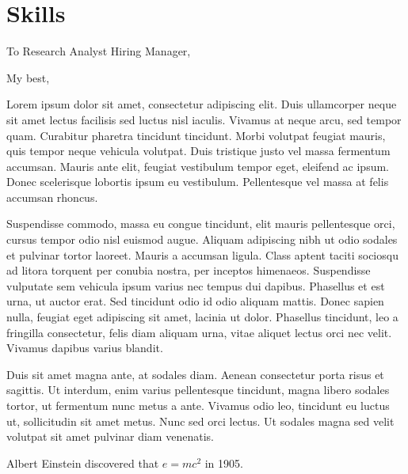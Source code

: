 \documentclass[11pt, sans]{moderncv}
\begin{document}
\section*{Skills}
\label{sec:org39c2da3}

\clearpage
{}
\date{\today}
\opening{To Research Analyst Hiring Manager,}
\closing{My best,}
\makelettertitle

Lorem ipsum dolor sit amet, consectetur adipiscing elit. Duis
ullamcorper neque sit amet lectus facilisis sed luctus nisl
iaculis. Vivamus at neque arcu, sed tempor quam. Curabitur pharetra
tincidunt tincidunt. Morbi volutpat feugiat mauris, quis tempor neque
vehicula volutpat. Duis tristique justo vel massa fermentum
accumsan. Mauris ante elit, feugiat vestibulum tempor eget, eleifend
ac ipsum. Donec scelerisque lobortis ipsum eu vestibulum. Pellentesque
vel massa at felis accumsan rhoncus.


Suspendisse commodo, massa eu congue tincidunt, elit mauris
pellentesque orci, cursus tempor odio nisl euismod augue. Aliquam
adipiscing nibh ut odio sodales et pulvinar tortor laoreet. Mauris a
accumsan ligula. Class aptent taciti sociosqu ad litora torquent per
conubia nostra, per inceptos himenaeos. Suspendisse vulputate sem
vehicula ipsum varius nec tempus dui dapibus. Phasellus et est urna,
ut auctor erat. Sed tincidunt odio id odio aliquam mattis. Donec
sapien nulla, feugiat eget adipiscing sit amet, lacinia ut
dolor. Phasellus tincidunt, leo a fringilla consectetur, felis diam
aliquam urna, vitae aliquet lectus orci nec velit. Vivamus dapibus
varius blandit.


Duis sit amet magna ante, at sodales diam. Aenean consectetur porta
risus et sagittis. Ut interdum, enim varius pellentesque tincidunt,
magna libero sodales tortor, ut fermentum nunc metus a ante. Vivamus
odio leo, tincidunt eu luctus ut, sollicitudin sit amet metus. Nunc
sed orci lectus. Ut sodales magna sed velit volutpat sit amet pulvinar
diam venenatis.


Albert Einstein discovered that \(e=mc^2\) in 1905.


\makeletterclosing
\end{document}
